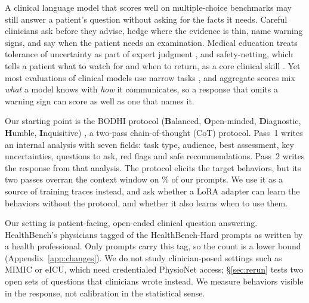 \documentclass{article}
\newcommand{\bodhi}{BODHI}
\newcommand{\hbhard}{HealthBench-Hard}
\begin{document}
A clinical language model that scores well on multiple-choice benchmarks may still answer a
patient's question without asking for the facts it needs. Careful clinicians ask before they
advise, hedge where the evidence is thin, name warning signs, and say when the patient needs an
examination. Medical education treats tolerance of uncertainty as part of expert judgment
\citep{simpkin2016tolerating}, and safety-netting, which tells a patient what to watch for and when
to return, as a core clinical skill \citep{jones2019safety}. Yet most evaluations of clinical models
use narrow tasks \citep{wornow2023shaky}, and aggregate scores mix \emph{what} a model knows with
\emph{how} it communicates, so a response that omits a warning sign can score as well as one that
names it.

Our starting point is the \bodhi{} protocol (\textbf{B}alanced, \textbf{O}pen-minded,
\textbf{D}iagnostic, \textbf{H}umble, \textbf{I}nquisitive) \citep{bodhi2026}, a two-pass
chain-of-thought (CoT) protocol. Pass~1 writes an internal analysis with seven fields: task type,
audience, best assessment, key uncertainties, questions to ask, red flags and safe recommendations.
Pass~2 writes the response from that analysis. The protocol elicits the target behaviors, but its
two passes overran the context window on \statHBMedGemmaMayCompletionDropPctBaseBodhi\% of our
prompts. We use it as a source of training traces instead, and ask whether a LoRA adapter can learn
the behaviors without the protocol, and whether it also learns when to use them.

Our setting is patient-facing, open-ended clinical question answering. HealthBench's physicians
tagged \statHBMedGemmaMayLabelClinicianUserPopPos{} of the \statHBMedGemmaMayPopulationPrompts{} \hbhard{} prompts as written by a
health professional. Only \statHBMedGemmaMayLabelClinicianUserPopLabelled{} prompts carry this tag, so the count is a lower
bound (Appendix~\ref{app:changes}). We do not study clinician-posed
settings such as MIMIC or eICU, which need credentialed PhysioNet access; \S\ref{sec:rerun} tests
two open sets of questions that clinicians wrote instead. We measure behaviors visible in the response, not calibration in
the statistical sense.
\end{document}
